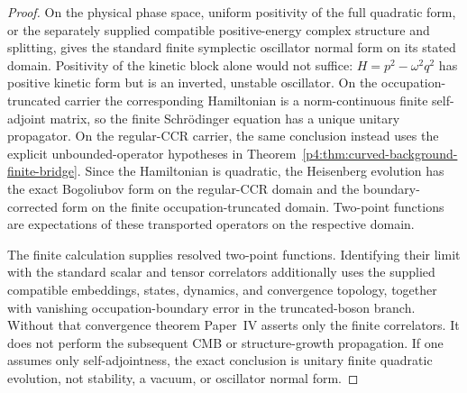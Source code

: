 \documentclass[12pt,a4paper]{article}
\begin{document}
\begin{proof}
\leavevmode\par\noindent
On the physical phase space, uniform positivity of the full quadratic form,
or the separately supplied compatible positive-energy complex structure
and splitting, gives the standard finite symplectic oscillator normal form
on its stated domain.  Positivity of the kinetic block
alone would not suffice: \(H=p^2-\omega^2q^2\) has positive kinetic form but
is an inverted, unstable oscillator.  On the occupation-truncated carrier
the corresponding Hamiltonian is a norm-continuous finite self-adjoint
matrix, so the finite Schr\"odinger equation has a unique unitary propagator.
On the regular-CCR carrier, the same conclusion instead uses the explicit
unbounded-operator hypotheses in
Theorem~\ref{p4:thm:curved-background-finite-bridge}.  Since the Hamiltonian
is quadratic, the Heisenberg evolution has the exact Bogoliubov form on the
regular-CCR domain and the boundary-corrected form on the finite
occupation-truncated domain.  Two-point functions are expectations of these
transported operators on the respective domain.

The finite calculation supplies resolved two-point functions.  Identifying
their limit with the standard scalar and tensor correlators additionally
uses the supplied compatible embeddings, states, dynamics, and convergence
topology, together with vanishing occupation-boundary error in the
truncated-boson branch.  Without that convergence theorem Paper~IV asserts
only the finite correlators.  It does not perform the subsequent CMB or
structure-growth propagation.  If one assumes only self-adjointness, the exact conclusion is
unitary finite quadratic evolution, not stability, a vacuum, or oscillator
normal form.
\end{proof}
\end{document}
